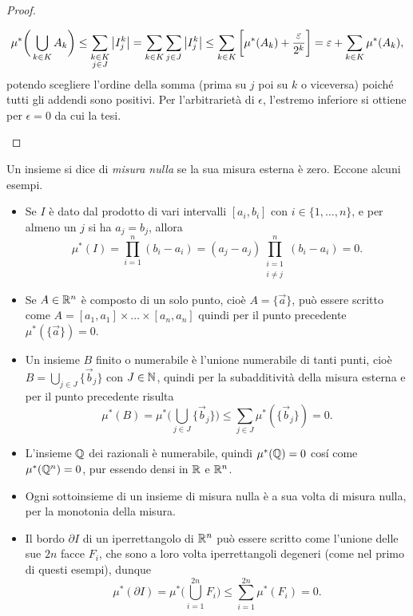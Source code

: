 \begin{proof}
\begin{enumerate}
			\begin{equation}
				\mu^*\bigg(\bigcup_{k\in K}A_k\bigg)\leq\sum_{\substack{k\in K\\j\in J}}\left|{I^k_j}\right|=\sum_{k\in K}\sum_{j\in J}\left|{I^k_j}\right|\leq\sum_{k\in K}\bigg[\mu^*(A_k)+\frac{\varepsilon}{2^k}\bigg]=\varepsilon+\sum_{k\in K}\mu^*(A_k),
			\end{equation}
			potendo scegliere l'ordine della somma (prima su $j$ poi su $k$ o viceversa) poich\'e tutti gli addendi sono positivi.
			Per l'arbitrarietà di $\epsilon$, l'estremo inferiore si ottiene per $\epsilon=0$ da cui la tesi.
	\end{enumerate}
\end{proof}
Un insieme si dice di \emph{misura nulla} se la sua misura esterna è zero.
Eccone alcuni esempi.
\begin{itemize}
	\item Se $I$ è dato dal prodotto di vari intervalli $[a_i,b_i]$ con $i\in\{1,\dots,n\}$, e per almeno un $j$ si ha $a_j=b_j$, allora
		\begin{equation}
			\mu^*(I)=\prod_{i=1}^n(b_i-a_i)=(a_j-a_j)\prod_{\substack{i=1\\i\neq j}}^n(b_i-a_i)=0.
		\end{equation}
	\item Se $A\in\mathbb{R}^n$ è composto di un solo punto, cioè $A=\{\vec a\}$, può essere scritto come $A=[a_1,a_1]\times\dots\times[a_n,a_n]$ quindi per il punto precedente $\mu^*(\{\vec a\})=0$.
	\item Un insieme $B$ finito o numerabile è l'unione numerabile di tanti punti, cioè $B=\bigcup_{j\in J}\{\vec b_j\}$ con $J\in\mathbb{N}$, quindi per la subadditività della misura esterna e per il punto precedente risulta
		\begin{equation}
			\mu^*(B)=\mu^*\bigg(\bigcup_{j\in J}\{\vec b_j\}\bigg)\leq\sum_{j\in J}\mu^*(\{\vec b_j\})=0.
		\end{equation}
	\item L'insieme $\mathbb{Q}$ dei razionali è numerabile, quindi $\mu^*(\mathbb{Q})=0$ cos\'i come $\mu^*(\mathbb{Q}^n)=0$, pur essendo densi in $\mathbb{R}$ e $\mathbb{R}^n$.
	\item Ogni sottoinsieme di un insieme di misura nulla è a sua volta di misura nulla, per la monotonia della misura.
	\item Il bordo $\partial I$ di un iperrettangolo di $\mathbb{R}^n$ può essere scritto come l'unione delle sue $2n$ facce $F_i$, che sono a loro volta iperrettangoli degeneri (come nel primo di questi esempi), dunque
		\begin{equation}
			\mu^*(\partial I)=\mu^*\bigg(\bigcup_{i=1}^{2n} F_i\bigg)\leq\sum_{i=1}^{2n}\mu^*(F_i)=0.
		\end{equation}
\end{itemize}

